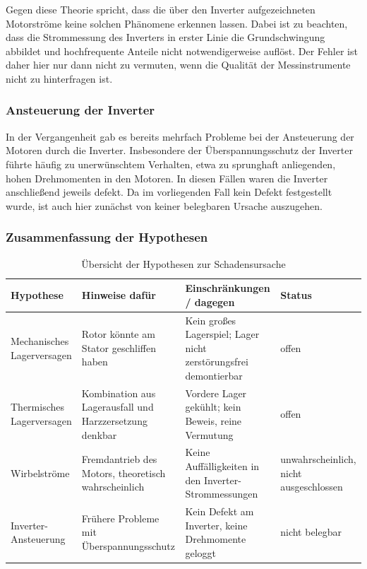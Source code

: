 Gegen diese Theorie spricht, dass die über den Inverter aufgezeichneten Motorströme keine solchen Phänomene erkennen lassen. Dabei ist zu beachten, dass die Strommessung des Inverters in erster Linie die Grundschwingung abbildet und hochfrequente Anteile nicht notwendigerweise auflöst. Der Fehler ist daher hier nur dann nicht zu vermuten, wenn die Qualität der Messinstrumente nicht zu hinterfragen ist.

\subsubsection{Ansteuerung der Inverter}
\label{subsec:hyp_inverter}

In der Vergangenheit gab es bereits mehrfach Probleme bei der Ansteuerung der Motoren durch die Inverter. Insbesondere der Überspannungsschutz der Inverter führte häufig zu unerwünschtem Verhalten, etwa zu sprunghaft anliegenden, hohen Drehmomenten in den Motoren. In diesen Fällen waren die Inverter anschließend jeweils defekt. Da im vorliegenden Fall kein Defekt festgestellt wurde, ist auch hier zunächst von keiner belegbaren Ursache auszugehen.

\subsubsection{Zusammenfassung der Hypothesen}
\label{subsec:hyp_zusammenfassung}

\begin{table}[htbp]
    \centering
    \caption{Übersicht der Hypothesen zur Schadensursache}
    \label{tab:hypothesen}
    \begin{tabular}{|p{3.2cm}|p{4.5cm}|p{4.5cm}|p{1.8cm}|}
        \hline
        Hypothese & Hinweise dafür & Einschränkungen / dagegen & Status \\
        \hline
        Mechanisches Lagerversagen
          & Rotor könnte am Stator geschliffen haben
          & Kein großes Lagerspiel; Lager nicht zerstörungsfrei demontierbar
          & offen \\
        \hline
        Thermisches Lagerversagen
          & Kombination aus Lagerausfall und Harzzersetzung denkbar
          & Vordere Lager gekühlt; kein Beweis, reine Vermutung
          & offen \\
        \hline
        Wirbelströme
          & Fremdantrieb des Motors, theoretisch wahrscheinlich
          & Keine Auffälligkeiten in den Inverter-Strommessungen
          & unwahrscheinlich, nicht ausgeschlossen \\
        \hline
        Inverter-Ansteuerung
          & Frühere Probleme mit Überspannungsschutz
          & Kein Defekt am Inverter, keine Drehmomente geloggt
          & nicht belegbar \\
        \hline
    \end{tabular}
\end{table}


